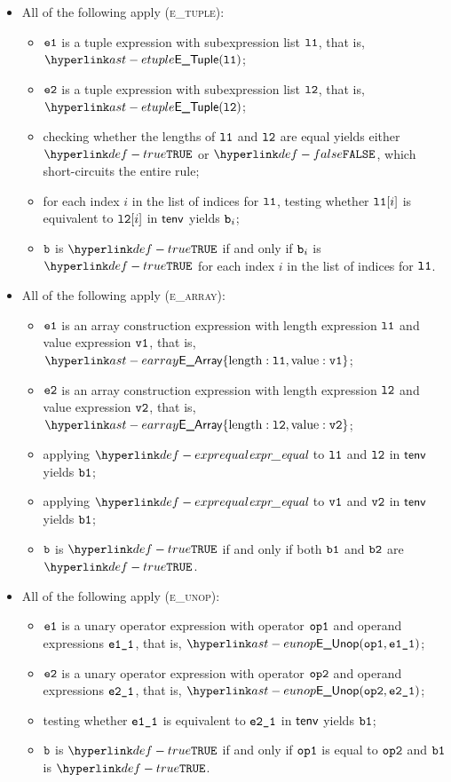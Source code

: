 \begin{itemize}
  \item All of the following apply (\textsc{e\_tuple}):
  \begin{itemize}
    \item $\texttt{e1}$ is a tuple expression with subexpression list $\texttt{l1}$,
          that is, $\ETuple(\vlone)$;
    \item $\texttt{e2}$ is a tuple expression with subexpression list $\texttt{l2}$,
          that is, $\ETuple(\vltwo)$;
    \item checking whether the lengths of $\texttt{l1}$ and $\texttt{l2}$ are equal yields either $\True$ or $\False$, which short-circuits
          the entire rule;
    \item for each index $i$ in the list of indices for $\texttt{l1}$, testing whether $\texttt{l1}[i]$ is equivalent to $\texttt{l2}[i]$
          in $\textsf{tenv}$ yields $\texttt{b}_i$\ProseOrTypeError;
    \item $\texttt{b}$ is $\True$ if and only if $\texttt{b}_i$ is $\True$ for each index $i$ in the list of indices for $\texttt{l1}$.
  \end{itemize}

  \item All of the following apply (\textsc{e\_array}):
  \begin{itemize}
    \item $\texttt{e1}$ is an array construction expression with length expression $\texttt{l1}$ and value expression $\texttt{v1}$,
          that is, $\EArray\{\EArrayLength: \vlone, \EArrayValue: \vvone\}$;
    \item $\texttt{e2}$ is an array construction expression with length expression $\texttt{l2}$ and value expression $\texttt{v2}$,
          that is, $\EArray\{\EArrayLength: \vltwo, \EArrayValue: \vvtwo\}$;
    \item applying $\exprequal$ to $\texttt{l1}$ and $\texttt{l2}$ in $\textsf{tenv}$ yields $\texttt{b1}$\ProseOrTypeError;
    \item applying $\exprequal$ to $\texttt{v1}$ and $\texttt{v2}$ in $\textsf{tenv}$ yields $\texttt{b1}$\ProseOrTypeError;
    \item $\texttt{b}$ is $\True$ if and only if both $\texttt{b1}$ and $\texttt{b2}$ are $\True$.
  \end{itemize}

  \item All of the following apply (\textsc{e\_unop}):
  \begin{itemize}
    \item $\texttt{e1}$ is a unary operator expression with operator $\texttt{op1}$ and operand expressions $\texttt{e1\_1}$,
          that is, $\EUnop(\opone, \veoneone)$;
    \item $\texttt{e2}$ is a unary operator expression with operator $\texttt{op2}$ and operand expressions $\texttt{e2\_1}$,
          that is, $\EUnop(\optwo, \vetwoone)$;
    \item testing whether $\texttt{e1\_1}$ is equivalent to $\texttt{e2\_1}$ in $\textsf{tenv}$ yields $\texttt{b1}$;
    \item $\texttt{b}$ is $\True$ if and only if $\texttt{op1}$ is equal to $\texttt{op2}$ and $\texttt{b1}$ is $\True$.
  \end{itemize}


\end{itemize}
